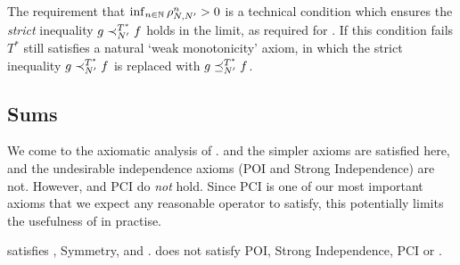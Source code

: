 The requirement that $\inf_{n \in \mathbb{N}}{\rho_{N,N'}^n} > 0$ is a technical
condition which ensures the \emph{strict} inequality $g \prec_{N'}^{T^*} f$
holds in the limit, as required for \monotonicity{}. If this condition fails $T^*$
still satisfies a natural `weak monotonicity' axiom, in which the strict
inequality $g \prec_{N'}^{T^*} f$ is replaced with $g \preceq_{N'}^{T^*} f$.

\subsection{Sums}

We come to the axiomatic analysis of \sums{}. \coherence{} and the simpler axioms
are satisfied here, and the undesirable independence axioms (POI and Strong
Independence) are not. However, \monotonicity{} and PCI do \emph{not} hold. Since
PCI is one of our most important axioms that we expect any reasonable operator
to satisfy, this potentially limits the usefulness of \sums{} in practise.

\begin{theorem}
\label{td_thm_sums_axioms}
    \sums{} satisfies \coherence{}, Symmetry, \unanimity{} and \groundedness{}. \sums{} does
    not satisfy POI, Strong Independence, PCI or \monotonicity{}.
\end{theorem}

